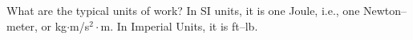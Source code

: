 {What are the typical units of work?}
{In SI units, it is one Joule, i.e., one Newton--meter, or kg$\cdot$m/s$^2\cdot$m. In Imperial Units, it is ft--lb.}
